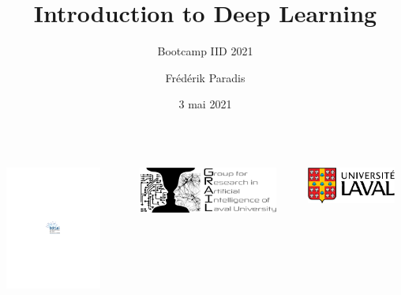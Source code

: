 \documentclass[english,usenames,dvipsnames]{beamer}
\title[]{Introduction to Deep Learning}
\subtitle{Bootcamp IID 2021}
\author[F. Paradis]{Frédérik Paradis}
\institute{\texttt{frederik.paradis.1@ulaval.ca}}
\date[]{3 mai 2021}
\begin{document}
\begin{frame}[nonum]
\titlepage
\begin{center}
	\vspace{-10mm}
	\begin{columns}
		\begin{column}{0.33\textwidth}
			\includegraphics[width=0.8\textwidth]{crdmul_en.pdf}
		\end{column}
		\begin{column}{0.33\textwidth}
			\includegraphics[width=0.9\textwidth]{grail.pdf}
		\end{column}
		\begin{column}{0.33\textwidth}
			\hspace{-5mm}
			\includegraphics[width=0.9\textwidth]{ul.pdf}
		\end{column}
	\end{columns}
\end{center}
\end{frame}
\end{document}
